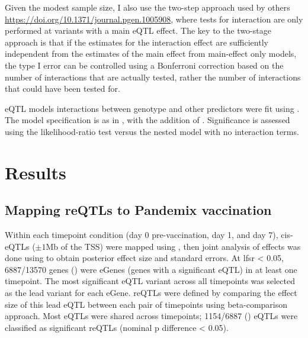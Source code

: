 Given the modest sample size, I also use the two-step approach used by others\autocite{westra2015CellSpecificEQTL, kim-hellmuth2017GeneticRegulatoryEffects, davenport2018DiscoveringVivoCytokineeQTL} \url{https://doi.org/10.1371/journal.pgen.1005908},
where tests for interaction are only performed at variants with a main \gls{eQTL} effect.
%
%
The key to the two-stage approach is that if the estimates for the interaction effect are sufficiently independent from the estimates of the main effect from main-effect only models,
the type I error can be controlled using a Bonferroni correction based on the number of interactions that are actually tested, rather the number of interactions that could have been tested for\autocite{kooperberg2008IncreasingPowerIdentifying, }.

\gls{eQTL} models interactions between genotype and other predictors were fit using .
The model specification is as in , with the addition of .
Significance is assessed using the likelihood-ratio test versus the nested model with no interaction terms.

\section{Results}

\subsection{Mapping reQTLs to Pandemix vaccination}

Within each timepoint condition (day 0 pre-vaccination, day 1, and day 7), cis-\glspl{eQTL} ($\pm 1 \text{Mb}$ of the \gls{TSS}) were mapped using ,
then joint analysis of effects was done using  to obtain posterior effect size and standard errors.
At \gls{lfsr} < 0.05, 6887/13570 genes () were eGenes (genes with a significant \gls{eQTL}) in at least one timepoint.
The most significant \gls{eQTL} variant across all timepoints was selected as the lead variant for each eGene.
\glspl{reQTL} were defined by comparing the effect size of this lead \gls{eQTL} between each pair of timepoints using beta-comparison approach.
Most \glspl{eQTL} were shared across timepoints; 1154/6887 () \glspl{eQTL} were classified as significant \glspl{reQTL} (nominal p difference < 0.05).

